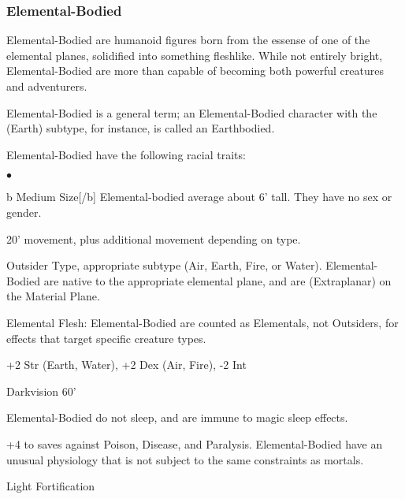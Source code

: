 \subsubsection{Elemental-Bodied}

Elemental-Bodied are humanoid figures born from the essense of one of the elemental planes, solidified into something fleshlike.  While not entirely bright, Elemental-Bodied are more than capable of becoming both powerful creatures and adventurers.

Elemental-Bodied is a general term; an Elemental-Bodied character with the (Earth) subtype, for instance, is called an Earthbodied.

Elemental-Bodied have the following racial traits:
\begin{list}{$\bullet$}{\itemspace}
    \item [b]Medium Size[/b] Elemental-bodied average about 6' tall.  They have no sex or gender.
    \item 20' movement, plus additional movement depending on type.
    \item Outsider Type, appropriate subtype (Air, Earth, Fire, or Water).  Elemental-Bodied are native to the appropriate elemental plane, and are (Extraplanar) on the Material Plane.
    \item Elemental Flesh: Elemental-Bodied are counted as Elementals, not Outsiders, for effects that target specific creature types.
    \item +2 Str (Earth, Water), +2 Dex (Air, Fire), -2 Int
    \item Darkvision 60'
    \item Elemental-Bodied do not sleep, and are immune to magic sleep effects.
    \item +4 to saves against Poison, Disease, and Paralysis.  Elemental-Bodied have an unusual physiology that is not subject to the same constraints as mortals.
    \item Light Fortification
\end{list}

